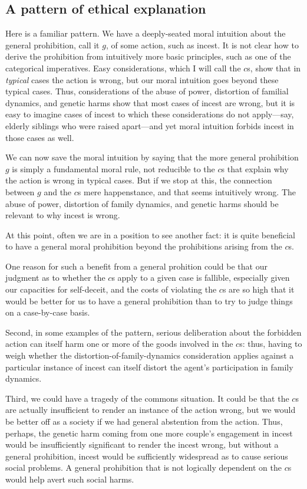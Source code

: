 \subsection{A pattern of ethical explanation}
Here is a familiar pattern. We have a deeply-seated moral intuition about the general prohibition, call it $g$, of some action,
such as incest. It is not clear how to derive the prohibition from intuitively more basic principles, such as one of 
the categorical imperatives. Easy considerations, which I will call the $c$s, show that in \textit{typical} cases the action is wrong,
but our moral intuition goes beyond these typical cases. Thus, considerations of the abuse of power, distortion of 
familial dynamics, and genetic harms show that most cases of incest are wrong, but it is easy to imagine cases
of incest to which these considerations do not apply---say, elderly siblings who were raised apart---and yet moral
intuition forbids incest in those cases as well.

We can now save the moral intuition by saying that the more general prohibition $g$ is simply a fundamental moral rule,
not reducible to the $c$s that explain why the action is wrong in typical cases. But if we stop
at this, the connection between $g$ and the $c$s mere happenstance, and that seems intuitively wrong. The abuse of 
power, distortion of family dynamics, and genetic harms should be relevant to why incest is wrong.

At this point, often we are in a position to see another fact: it is quite beneficial to have a 
general moral prohibition beyond the prohibitions arising from the $c$s. 

One reason for such a benefit from a general prohition could be that our judgment as to whether the $c$s apply to a given case is fallible, especially given our capacities
for self-deceit, and the costs of violating the $c$s are so high that it would be better for us to have a 
general prohibition than to try to judge things on a case-by-case basis. 

Second, in some examples of
the pattern, serious deliberation about the forbidden action can itself harm one or more of the goods
involved in the $c$s: thus, having to weigh whether the distortion-of-family-dynamics consideration
applies against a particular instance of incest can itself distort the agent's participation in family
dynamics. 

Third, we could have a tragedy of the commons situation. It could be that the $c$s are actually insufficient
to render an instance of the action wrong, but we would be better off as a society if we had general
abstention from the action. Thus, perhaps, the genetic harm coming from one more couple's engagement in incest
would be insufficiently significant to render the incest wrong, but without a general prohibition, incest
would be sufficiently widespread as to cause serious social problems. A general prohibition that is not
logically dependent on the $c$s would help avert such social harms.

